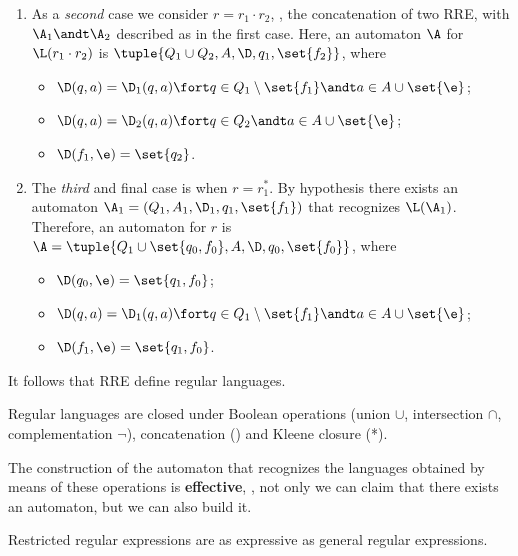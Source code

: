 \documentclass[oneside]{academica}
\begin{document}
\begin{proof*}
\begin{itemize}
\begin{enumerate}
      \item As a \textit{second} case we consider $r = r_1 \cdot r_2$, \ie, the concatenation of two RRE, with $\A_1 \andt \A_2$ described as in the first case.
        Here, an automaton $\A$ for $\L(r_1 \cdot r_2)$ is $\tuple{Q_1 \cup Q_2,A,\D,q_1,\set{f_2}}$, where
        \begin{itemize}
          \item $\D(q, a) = \D_1(q,a) \fort q \in Q_1 \setminus \set{f_1} \andt a \in A \cup \set{\e}$;
          \item $\D(q, a) = \D_2(q,a) \fort q \in Q_2 \andt a \in A \cup \set{\e}$;
          \item $\D(f_1,\e) = \set{q_2}$.
        \end{itemize}
      \item The \textit{third} and final case is when $r = r_1^*$.
        By hypothesis there exists an automaton $\A_1 = (Q_1,A_1,\D_1,q_1,\set{f_1})$ that recognizes $\L(\A_1)$.
        Therefore, an automaton for $r$ is $\A = \tuple{Q_1 \cup \set{q_0,f_0},A,\D,q_0,\set{f_0}}$, where
        \begin{itemize}
          \item $\D(q_0, \e) = \set{q_1,f_0}$;
          \item $\D(q, a) = \D_1(q,a) \fort q \in Q_1 \setminus \set{f_1} \andt a \in A \cup \set{\e}$;
          \item $\D(f_1,\e) = \set{q_1,f_0}$.
        \end{itemize}
    \end{enumerate}
  \end{itemize}
\end{proof*}

It follows that RRE define regular languages.

\begin{theorem*}
  Regular languages are closed under Boolean operations (union $\cup$, intersection $\cap$, complementation $\neg$), concatenation (\cdot) and Kleene closure (*).
\end{theorem*}

The construction of the automaton that recognizes the languages obtained by means of these operations is \textbf{effective}, \ie, not only we can claim that there exists an automaton, but we can also build it.

\begin{corollary*}
  Restricted regular expressions are as expressive as general regular expressions.
\end{corollary*}
\end{document}
